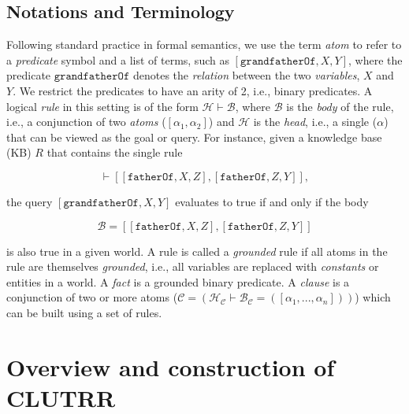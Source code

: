 \documentclass[letterpaper, 12pt]{report}
\begin{document}
\subsection{Notations and Terminology}

Following standard practice in formal semantics, we use the term \textit{atom} to refer to a \textit{predicate} symbol and a list of terms, such as $[\texttt{grandfatherOf},X,Y]$, where the predicate $\texttt{grandfatherOf}$ denotes the \textit{relation} between the two \textit{variables}, $X$ and $Y$. We restrict the predicates to have an arity of 2, i.e.,  binary predicates.
A logical \textit{rule} in this setting is of the form $\mathcal{H} \vdash \mathcal{B}$, where $\mathcal{B}$ is the \textit{body} of the rule, i.e., a conjunction of two \textit{atoms} ($[\alpha_1,\alpha_2]$) and $\mathcal{H}$ is the \textit{head}, i.e., a single  ($\alpha$) that can be viewed as the goal or query.
For instance, given a knowledge base (KB) $R$ that contains the single rule

\begin{equation}
  [\texttt{grandfatherOf},X,Y] \vdash [[\texttt{fatherOf},X,Z], [\texttt{fatherOf}, Z,Y]],
\end{equation}

\noindent the query $[\texttt{grandfatherOf},X,Y]$ evaluates to true if and only if the body

\begin{equation}
\mathcal{B}=[[\texttt{fatherOf},X,Z], [\texttt{fatherOf}, Z,Y]]
\end{equation}

\noindent is also true in a given world.
A rule is called a \textit{grounded} rule if all atoms in the rule are themselves \textit{grounded}, i.e., all variables are replaced with \textit{constants} or entities in a world. A \textit{fact} is a grounded binary predicate. A \textit{clause} is a conjunction of two or more atoms ($\mathcal{C}=(\mathcal{H}_{\mathcal{C}} \vdash \mathcal{B}_{\mathcal{C}} = ([\alpha_1,...,\alpha_n]))$) which can be built using a set of rules.

\section{Overview and construction of CLUTRR}
\label{sec:orgf6fb520}
\end{document}

